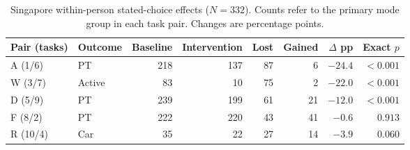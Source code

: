 \begin{table}[pos=htbp]
\centering\small
\caption{Singapore within-person stated-choice effects ($N=332$). Counts refer to the primary mode group in each task pair. Changes are percentage points.}
\label{tab:survey_results}\label{tab:survey_counts}
\setlength{\tabcolsep}{4pt}
\begin{tabular*}{\linewidth}{@{\extracolsep{\fill}}llrrrrrr@{}}
\toprule
Pair (tasks) & Outcome & Baseline & Intervention & Lost & Gained & $\Delta$ pp & Exact $p$ \\
\midrule
A (1/6) & PT & 218 & 137 & 87 & 6 & $-24.4$ & $<0.001$ \\
W (3/7) & Active & 83 & 10 & 75 & 2 & $-22.0$ & $<0.001$ \\
D (5/9) & PT & 239 & 199 & 61 & 21 & $-12.0$ & $<0.001$ \\
F (8/2) & PT & 222 & 220 & 43 & 41 & $-0.6$ & $0.913$ \\
R (10/4) & Car & 35 & 22 & 27 & 14 & $-3.9$ & $0.060$ \\
\bottomrule
\end{tabular*}
\par{}
\end{table}
